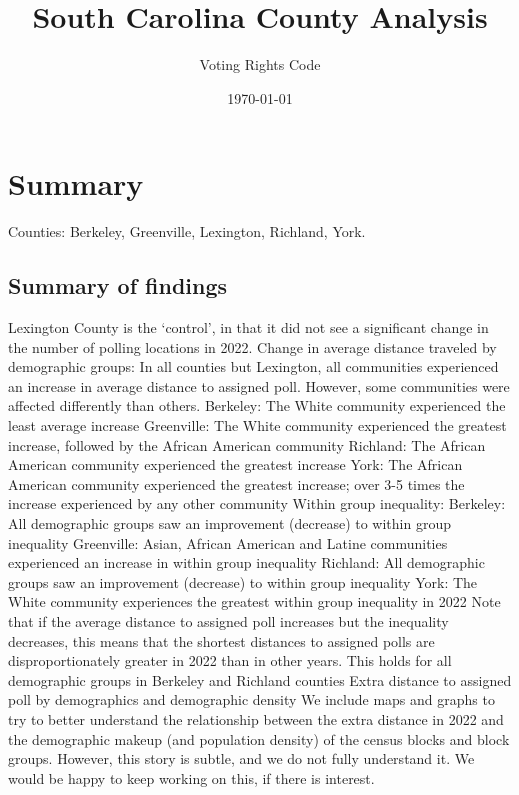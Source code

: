 \documentclass[11pt]{article}
\title{South Carolina County Analysis}
\author{Voting Rights Code}
\date{\today}
\theoremstyle{remark}
\theoremstyle{definition}
\begin{document}
\maketitle
\section{Summary}
	
	Counties: Berkeley, Greenville, Lexington, Richland, York.
\subsection{Summary of findings}

\begin{outline}
	\1 Lexington County is the `control', in that it did not see a significant change in the number of polling locations in 2022.
	\1 Change in average distance traveled by demographic groups:
		\2 In all counties but Lexington, all communities experienced an increase in average distance to assigned poll. However, some communities were affected differently than others. 
		\2 Berkeley: The White community experienced the least average increase
		\2 Greenville: The White community experienced the greatest increase, followed by the African American community
		\2 Richland: The African American community experienced the greatest increase
		\2 York: The African American community experienced the greatest increase; over 3-5 times the increase experienced by any other community
	\1 Within group inequality:
		\2 Berkeley: All demographic groups saw an improvement (decrease) to within group inequality
		\2 Greenville: Asian, African American and Latine communities experienced an increase in within group inequality
		\2 Richland: All demographic groups saw an improvement (decrease) to within group inequality
		\2 York: The White community experiences the greatest within group inequality in 2022
	\1 Note that if the average distance to assigned poll increases but the inequality decreases, this means that the shortest distances to assigned polls are disproportionately greater in 2022 than in other years. 
		\2 This holds for all demographic groups in Berkeley and Richland counties
	\1 Extra distance to assigned poll by demographics and demographic density
		\2 We include maps and graphs to try to better understand the relationship between the extra distance in 2022 and the demographic makeup (and population density) of the census blocks and block groups. However, this story is subtle, and we do not fully understand it. We would be happy to keep working on this, if there is interest.
\end{outline}
	
\end{document}
